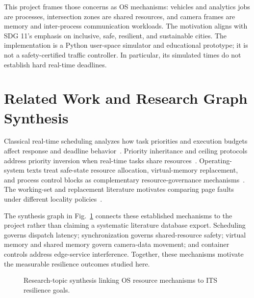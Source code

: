 \documentclass[conference]{IEEEtran}
\begin{document}
This project frames those concerns as OS mechanisms: vehicles and analytics
jobs are processes, intersection zones are shared resources, and camera frames
are memory and inter-process communication workloads. The motivation aligns
with SDG 11's emphasis on inclusive, safe, resilient, and sustainable cities.
The implementation is a Python user-space simulator and educational prototype;
it is not a safety-certified traffic controller. In particular, its simulated
times do not establish hard real-time deadlines.

\section{Related Work and Research Graph Synthesis}
Classical real-time scheduling analyzes how task priorities and execution
budgets affect response and deadline behavior~\cite{liu1973}. Priority
inheritance and ceiling protocols address priority inversion when real-time
tasks share resources~\cite{sha1990}. Operating-system texts treat safe-state
resource allocation, virtual-memory replacement, and process control blocks as
complementary resource-governance mechanisms~\cite{silberschatz2018}. The
working-set and replacement literature motivates comparing page faults under
different locality policies~\cite{belady1966}.

The synthesis graph in Fig.~\ref{fig:research-graph} connects these established
mechanisms to the project rather than claiming a systematic literature
database export. Scheduling governs dispatch latency; synchronization governs
shared-resource safety; virtual memory and shared memory govern camera-data
movement; and container controls address edge-service interference. Together,
these mechanisms motivate the measurable resilience outcomes studied here.

\begin{figure}[t]
\centering
{}
\caption{Research-topic synthesis linking OS resource mechanisms to ITS
resilience goals.}
\label{fig:research-graph}
\end{figure}
\end{document}
